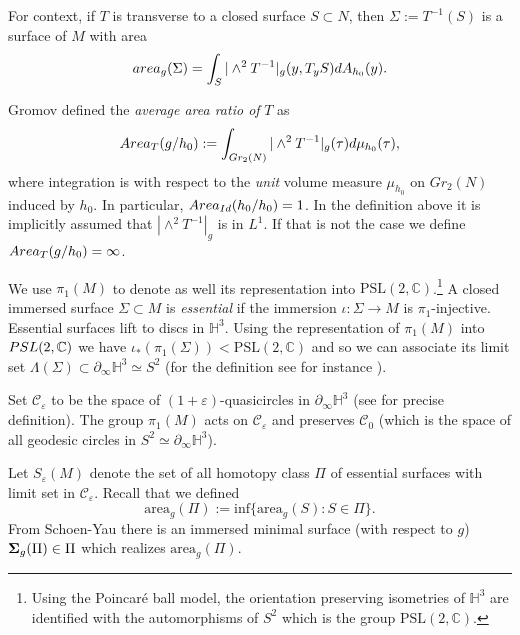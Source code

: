 \documentclass[11pt]{amsart}
\def\H{\mathbb H}
\def\C{\mathbb C}
\theoremstyle{remark}
\theoremstyle{definition}
\begin{document}
{{	For context, if $T$ is transverse to a closed surface $S\subset {N}$, then $\Sigma:=T^{-1}(S)$ is a surface of ${M}$  
	{with area} 
	\begin{equation*}\label{coarea}
		{\rm area}_g(\Sigma)=\int_{{S}}|\wedge^2T^{-1}|_g(y,T_yS)dA_{h_0}(y).
	\end{equation*}
	
	Gromov \cite[page 73]{gromov}  defined the {\em average area ratio of} $T$ as
	\begin{equation}\label{av.area.ratio}
		{\rm Area}_T(g/h_0):=\int_{Gr_2(N)}|\wedge^2T^{-1}|_g(\tau)d\mu_{h_0}(\tau),
	\end{equation}
	where integration is with respect to the {\em unit} volume measure $\mu_{h_0}$  on $Gr_2(N)$ induced by $h_0$. In particular, ${\rm Area}_{{\rm Id}}(h_0/h_0)=1$. {In the definition above it is implicitly assumed that $|\wedge^2T^{-1}|_g$ is in $L^1$. If that is not the case we define ${\rm Area}_T(g/h_0)=\infty$}.
	
	\medskip
	
	
	We use  $\pi_1(M)$ to denote as well its representation into $\text{PSL}(2,\C)$.\footnote{Using the Poincar\'e ball model, the orientation preserving isometries of $\H^3$ are identified with the automorphisms of $S^2$ which is the group $\text{PSL}(2,\C).$} A closed immersed surface $\Sigma\subset M$ is {\em essential} if the immersion $\iota:\Sigma \rightarrow M$ is $\pi_1$-injective. Essential surfaces lift to discs in $\H^3$. Using the representation of $\pi_1(M)$ into ${\rm PSL}(2,\C)$ we have $\iota_{*}(\pi_1(\Sigma))< \text{PSL}(2,\C)$ and so we can associate its limit set $\Lambda(\Sigma)\subset \partial_{\infty}\H^3\simeq S^2$ (for the definition see for instance \cite[Section 2.2]{cal-marques-neves}).  %
	
	
	Set  $\mathcal C_\varepsilon$ to be  the space of $(1+\varepsilon)$-quasicircles in $\partial_{\infty}\H^3$ (see \cite[Definition 2.3]{cal-marques-neves} for precise definition). The group $\pi_1(M)$ acts on  $\mathcal C_\varepsilon$ and preserves $\mathcal C_0$ (which is the space of all geodesic circles in $S^2\simeq\partial_{\infty}\H^3$). 
	
	Let $S_{\varepsilon}(M)$ denote the set of all homotopy class $\Pi$ of essential surfaces with limit set in $\mathcal C_\varepsilon$. Recall that we defined
	$$\text{area}_{g}(\Pi):= {\text{inf}} \{\text{area}_{g}(S): S\in \Pi\}.$$
	From Schoen-Yau  \cite{schoen-yau} there is an immersed minimal surface (with respect to $g$) ${\bf \Sigma}_g(\Pi)\in\Pi$ which realizes $\text{area}_{g}(\Pi)$.
	
}}
\end{document}
